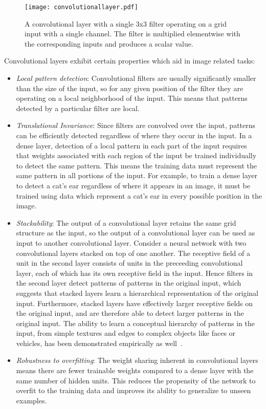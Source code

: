 
\begin{figure}
	\centering
	\texttt{[image: convolutionallayer.pdf]}
	\caption{A convolutional layer with a single 3x3 filter operating on a grid input with a single channel. The filter is multiplied elementwise with the corresponding inputs and produces a scalar value.}
	\label{fig:convolutionallayer}
\end{figure}


Convolutional layers exhibit certain properties which aid in image related tasks:
\begin{itemize}
\item
\textit{Local pattern detection}: Convolutional filters are usually significantly smaller than the size of the input, so for any given position of the filter they are operating on a local neighborhood of the input. 
This means that patterns detected by a particular filter are local.
\item
\textit{Translational Invariance}: Since filters are convolved over the input, patterns can be efficiently detected regardless of where they occur in the input.
In a dense layer, detection of a local pattern in each part of the input requires that weights associated with each region of the input be trained individually to detect the same pattern.
This means the training data must represent the same pattern in all portions of the input. 
For example, to train a dense layer to detect a cat's ear regardless of where it appears in an image, it must be trained using data which represent a cat's ear in every possible position in the image.
\item
\textit{Stackability}: The output of a convolutional layer retains the same grid structure as the input, so the output of a convolutional layer can be used as input to another convolutional layer.
Consider a neural network with two convolutional layers stacked on top of one another.
The receptive field of a unit in the second layer consists of units in the preceeding convolutional layer, each of which has its own receptive field in the input.
Hence filters in the second layer detect patterns of patterns in the original input, which suggests that stacked layers learn a hierarchical representation of the original input.
Furthermore, stacked layers have effectively larger receptive fields on the original input, and are therefore able to detect larger patterns in the original input.
The ability to learn a conceptual hierarchy of patterns in the input, from simple textures and edges to complex objects like faces or vehicles, has been demonstrated empirically as well~\cite{zeiler2013}.
\item
\textit{Robustness to overfitting}: The weight sharing inherent in convolutional layers means there are fewer trainable weights compared to a dense layer with the same number of hidden units. 
This reduces the propensity of the network to overfit to the training data and improves its ability to generalize to unseen examples.
\end{itemize}

